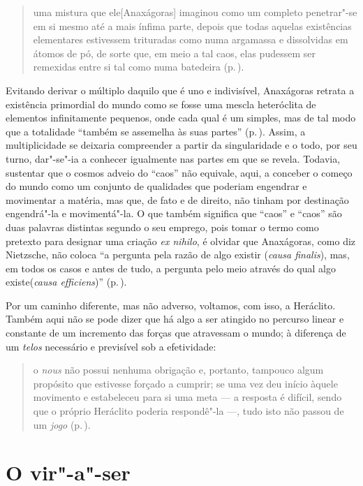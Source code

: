\begin{quote} uma mistura que ele[Anaxágoras] imaginou como um completo
 penetrar"-se em si mesmo até a mais ínfima parte, depois que todas aquelas
 existências elementares estivessem trituradas como numa argamassa e
 dissolvidas em átomos de pó, de sorte que, em meio a tal caos, elas pudessem
 ser remexidas entre si tal como numa batedeira (p.\,\pageref{mistura}).
\end{quote} 

Evitando derivar o múltiplo daquilo que é uno e indivisível, Anaxágoras
retrata a existência primordial do mundo como se fosse uma mescla heteróclita
de elementos infinitamente pequenos, onde cada qual é um simples, mas de tal
modo que a totalidade ``também se assemelha às suas partes'' (p.\,\pageref{suaspartes}). 
Assim, a multiplicidade se deixaria compreender a partir da
singularidade e o todo, por seu turno, dar"-se"-ia a conhecer igualmente nas
partes em que se revela. Todavia, sustentar que o cosmos adveio do ``caos''
não equivale, aqui, a conceber o começo do mundo como um conjunto de
qualidades que poderiam engendrar e movimentar a matéria, mas que, de fato e
de direito, não tinham por destinação engendrá"-la e movimentá"-la. O que
também significa que ``caos'' e ``caos'' são duas palavras distintas segundo
o seu emprego, pois tomar o termo como pretexto para designar uma
criação \textit{ex nihilo}, é olvidar que Anaxágoras, como diz Nietzsche, não
coloca ``a pergunta pela razão de algo existir (\textit{causa finalis}), mas,
em todos os casos e antes de tudo, a pergunta pelo meio através do qual algo
existe(\textit{causa efficiens})'' (p.\,\pageref{causafinalis}).

Por um caminho diferente, mas não adverso, voltamos, com isso, a Heráclito.
Também aqui não se pode dizer que há algo a ser atingido no percurso linear e
constante de um incremento das forças que atravessam o mundo; à diferença de
um \textit{telos} necessário e previsível sob a efetividade: 

\begin{quote} o \textit{nous} não possui nenhuma obrigação e, portanto,
 tampouco algum propósito que estivesse forçado a cumprir; se uma vez deu
 início àquele movimento e estabeleceu para si uma meta --- a resposta é
 difícil, sendo que o próprio Heráclito poderia respondê"-la ---, tudo isto
 não passou de um
\textit{jogo} (p.\,\pageref{naopossuinenhuma}).
\end{quote} 

\section{O vir"-a"-ser}

